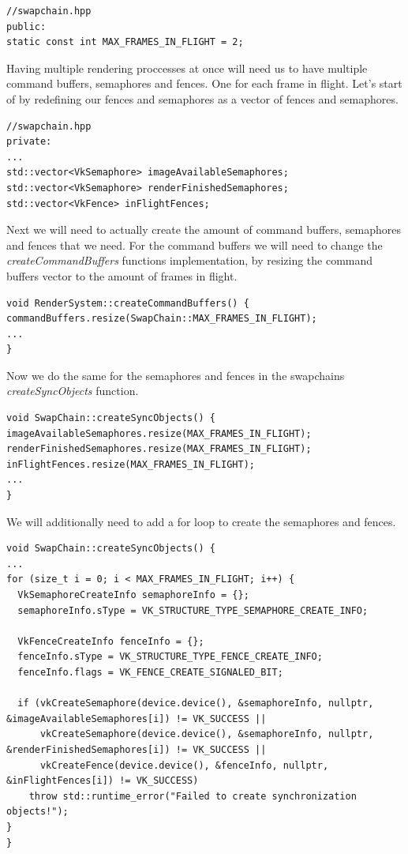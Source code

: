 \documentclass[12pt]{report} \usepackage{preamble}
\begin{document}
\begin{lstlisting}[Language=C++]
//swapchain.hpp
public:
static const int MAX_FRAMES_IN_FLIGHT = 2;
\end{lstlisting}

Having multiple rendering proccesses at once will need us to have multiple command buffers, semaphores and fences.
One for each frame in flight. Let's start of by redefining our fences and semaphores as a vector of fences and semaphores.

\begin{lstlisting}[Language=C++]
//swapchain.hpp
private:
...
std::vector<VkSemaphore> imageAvailableSemaphores;
std::vector<VkSemaphore> renderFinishedSemaphores;
std::vector<VkFence> inFlightFences;
\end{lstlisting}

Next we will need to actually create the amount of command buffers, semaphores and fences that we need. For the
command buffers we will need to change the \textit{createCommandBuffers} functions implementation, by resizing the command buffers
vector to the amount of frames in flight.

\begin{lstlisting}[Language=C++]
void RenderSystem::createCommandBuffers() {
commandBuffers.resize(SwapChain::MAX_FRAMES_IN_FLIGHT);
...
}
\end{lstlisting}

Now we do the same for the semaphores and fences in the swapchains \textit{createSyncObjects} function.

\begin{lstlisting}[Language=C++]
void SwapChain::createSyncObjects() {
imageAvailableSemaphores.resize(MAX_FRAMES_IN_FLIGHT);
renderFinishedSemaphores.resize(MAX_FRAMES_IN_FLIGHT);
inFlightFences.resize(MAX_FRAMES_IN_FLIGHT);
...
}
\end{lstlisting}

We will additionally need to add a for loop to create the semaphores and fences.

\begin{lstlisting}[Language=C++]
void SwapChain::createSyncObjects() {
...
for (size_t i = 0; i < MAX_FRAMES_IN_FLIGHT; i++) {
  VkSemaphoreCreateInfo semaphoreInfo = {};
  semaphoreInfo.sType = VK_STRUCTURE_TYPE_SEMAPHORE_CREATE_INFO;

  VkFenceCreateInfo fenceInfo = {};
  fenceInfo.sType = VK_STRUCTURE_TYPE_FENCE_CREATE_INFO;
  fenceInfo.flags = VK_FENCE_CREATE_SIGNALED_BIT;

  if (vkCreateSemaphore(device.device(), &semaphoreInfo, nullptr, &imageAvailableSemaphores[i]) != VK_SUCCESS ||
      vkCreateSemaphore(device.device(), &semaphoreInfo, nullptr, &renderFinishedSemaphores[i]) != VK_SUCCESS ||
      vkCreateFence(device.device(), &fenceInfo, nullptr, &inFlightFences[i]) != VK_SUCCESS)
    throw std::runtime_error("Failed to create synchronization objects!");
}
}
\end{lstlisting}
\end{document}
